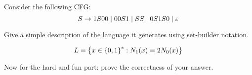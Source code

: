 \begin{problem}
  Consider the following CFG:
  \[
    S \to 1S00 \mid 00S1 \mid SS \mid 0S1S0 \mid \varepsilon
  \]
  \begin{enumalph}
    \item Give a simple description of the language it generates
      using set-builder notation.
      \begin{Answer}
        \[
          L = \left\{x \in \left\{0, 1\right\}^* : N_1(x) = 2N_0(x)\right\}
        \]
      \end{Answer}
    \item Now for the hard and fun part: prove the correctness
      of your answer.
  \end{enumalph}
\end{problem}
